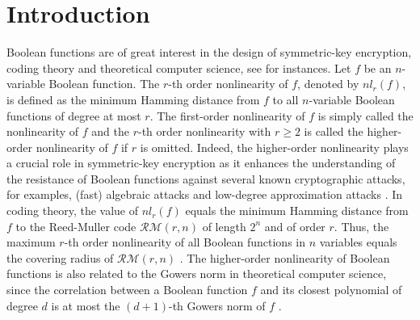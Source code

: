 \documentclass[preprint,10pt]{elsarticle}
\newcommand{\0}{\textbf{0}}
\newcommand{\1}{\textbf{1}}
\theoremstyle{plain}
\begin{document}
\section{Introduction}
    Boolean functions are of great interest in the design of symmetric-key encryption, coding theory and theoretical computer science,
    see \cite{Carlet2020book,CohenHLL1997RMcodecover,BhattacharyyaKSSZ2010gowers} for instances.
    Let $f$ be an $n$-variable Boolean function. The $r$-th order nonlinearity of $f$, denoted by $nl_r(f)$,
    is defined as the minimum Hamming distance from $f$ to all $n$-variable Boolean functions of degree at most $r$.
    The first-order nonlinearity of $f$ is simply called the nonlinearity of $f$ and
    the $r$-th order nonlinearity with $r\ge 2$ is called the higher-order nonlinearity of $f$ if $r$ is omitted.
    Indeed, the higher-order nonlinearity plays a crucial role in symmetric-key encryption as it enhances the understanding of the resistance of Boolean functions against several known cryptographic attacks, for examples,
    (fast) algebraic attacks \cite{FAA06,CFAA03,CM03,WT10} and low-degree approximation attacks \cite{Courtois2002XL_algorithm_and_NL_r,Golic1996lower_order_approximation,IwataK1999highorderbentfunction,KnudsenR1996nonlinear_approximation}.
    In coding theory, the value of $nl_r(f)$ equals the minimum Hamming distance from $f$ to the Reed-Muller code $\mathcal{RM}(r,n)$ of length $2^n$ and of order $r$.
    Thus, the maximum $r$-th order nonlinearity of all Boolean functions in $n$ variables equals the covering radius of $\mathcal{RM}(r,n)$ \cite{CohenHLL1997RMcodecover}.
    The higher-order nonlinearity of Boolean functions is also related to the Gowers norm in theoretical computer science, since the correlation between a
    Boolean function $f$ and its closest polynomial of degree $d$ is at most the $(d+1)$-th Gowers norm of $f$ \cite{BhattacharyyaKSSZ2010gowers}.
\end{document}
